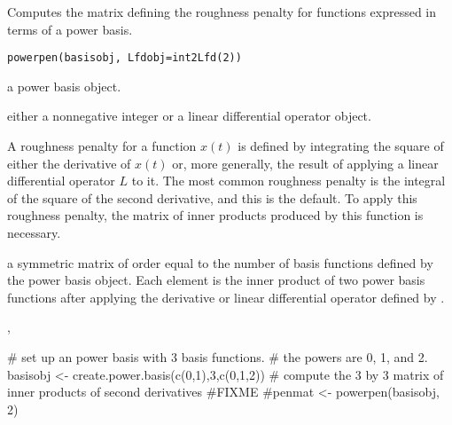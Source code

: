\begin{Description}\relax
Computes the matrix defining the roughness penalty for functions
expressed in terms of a power basis.
\end{Description}
\begin{Usage}
\begin{verbatim}
powerpen(basisobj, Lfdobj=int2Lfd(2))
\end{verbatim}
\end{Usage}
\begin{Arguments}
\begin{ldescription}
\item[\code{basisobj}] a power basis object.

\item[\code{Lfdobj}] either a nonnegative integer or a linear differential operator object.

\end{ldescription}
\end{Arguments}
\begin{Details}\relax
A roughness penalty for a function $ x(t) $ is defined by
integrating the square of either the derivative of  $ x(t) $ or,
more generally, the result of applying a linear differential operator
$ L $ to it.  The most common roughness penalty is the integral of
the square of the second derivative, and
this is the default. To apply this roughness penalty, the matrix of
inner products produced by this function is necessary.
\end{Details}
\begin{Value}
a symmetric matrix of order equal to the number of basis functions
defined by the power basis object.  Each element is the inner product
of two power basis functions after applying the derivative or linear
differential operator defined by .
\end{Value}
\begin{SeeAlso}\relax
{}, 
\end{SeeAlso}
\begin{Examples}
\begin{ExampleCode}

#  set up an power basis with 3 basis functions.
#  the powers are 0, 1, and 2.
basisobj <- create.power.basis(c(0,1),3,c(0,1,2))
#  compute the 3 by 3 matrix of inner products of second derivatives
#FIXME
#penmat <- powerpen(basisobj, 2)

\end{ExampleCode}
\end{Examples}

